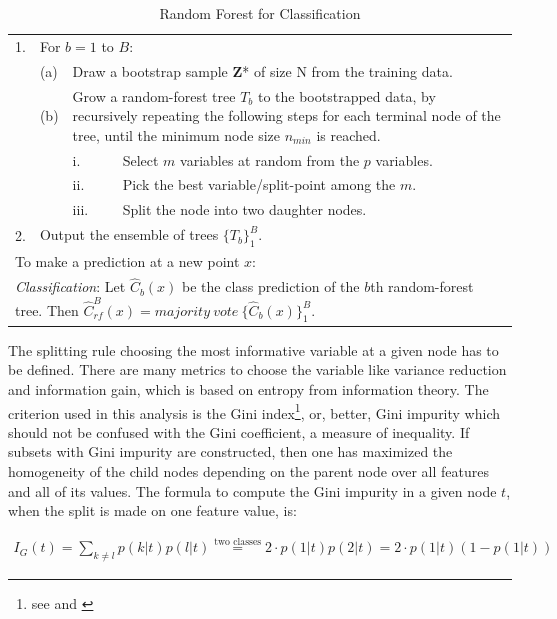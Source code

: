 \documentclass[12pt, a4paper]{scrartcl}
\newcommand{\ra}[1]{\renewcommand{\arraystretch}{#1}}
\theoremstyle{definition}
\begin{document}
\begin{table}[!ht]
	\caption{Random Forest for Classification \citep{friedman2009elements}}
	\label{tab:randomforest}
	\centering\ra{1.3}
	\begin{tabular}{@{}llll@{}}\toprule
	1.	& \multicolumn{3}{l}{For $b=1$ to $B$:}\\
		& (a) & \multicolumn{2}{p{13cm}}{Draw a bootstrap sample \textbf{Z}* of size N from the training data.}\\
		& (b) & \multicolumn{2}{p{13cm}}{Grow a random-forest tree $T_b$ to the bootstrapped data, by recursively repeating the following steps for each terminal node of the tree, until the minimum node size $n_{min}$ is reached.}\\
		& & i. & Select $m$ variables at random from the $p$ variables.\\
		& & ii. & Pick the best variable/split-point among the $m$.\\
		& & iii. & Split the node into two daughter nodes.\\
	2.	& \multicolumn{3}{l}{Output the ensemble of trees $\{T_b\}^B_1$.}\\[0.25cm]\midrule
	\multicolumn{4}{l}{To make a prediction at a new point $x$:}\\
	\multicolumn{4}{p{15cm}}{\textit{Classification}: Let $\hat{C}_b(x)$ be the class prediction of the $b$th random-forest tree. Then $\hat{C}^B_{rf}(x) = majority\ vote\ \{\hat{C}_b(x)\}^B_1$.}\\
	\bottomrule
	\end{tabular}
\end{table}

The splitting rule choosing the most informative variable at a given node has
to be defined. There are many metrics to choose the variable like variance
reduction and information gain, which is based on entropy from information
theory. The criterion used in this analysis is the Gini index\footnote{see
\citet[Chapter 9.2]{friedman2009elements} and
\citet{breiman1984classification}}, or, better, Gini impurity which should not
be confused with the Gini coefficient, a measure of inequality. If subsets with
Gini impurity are constructed, then one has maximized the homogeneity of the
child nodes depending on the parent node over all features and all of its
values. The formula to compute the Gini impurity in a given node $t$, when the
split is made on one feature value, is:

\begin{align*}
I_G(t) = \sum_{k\neq l}p(k|t)p(l|t) \overset{\text{two classes}}{=} 2\cdot p(1|t)p(2|t) = 2\cdot p(1|t)(1-p(1|t))
\end{align*}
\end{document}
